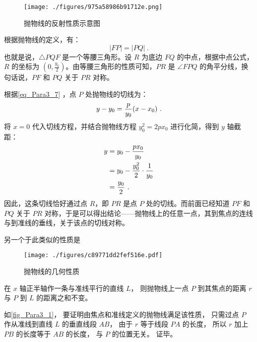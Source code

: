 \begin{figure}[ht]
\centering
\texttt{[image: ./figures/975a58986b91712e.png]}
\caption{抛物线的反射性质示意图} \label{fig_Para3_3}
\end{figure}

根据抛物线的定义，有：
\begin{equation}
|FP| = |PQ|~.
\end{equation}
也就是说，$\triangle PQF$ 是一个等腰三角形。设 $R$ 为底边 $FQ$ 的中点，根据中点公式，$R$ 的坐标为 $\displaystyle \left( 0, \frac{y_0}{2} \right)$。由等腰三角形的性质可知，$PR$ 是 $\angle FPQ$ 的角平分线，换句话说，$PF$ 和 $PQ$ 关于 $PR$ 对称。

根据\autoref{eq_Para3_7} ，点 $P$ 处抛物线的切线为：
\begin{equation}
y-y_0={p\over y_0}(x-x_0)~.
\end{equation}
将 $x = 0$ 代入切线方程，并结合抛物线方程 $y_0^2 = 2px_0$ 进行化简，得到 $y$ 轴截距：
\begin{equation}
\begin{split}
y&=y_0-{px_0\over y_0}\\
&=y_0-{y_0^2\over 2}\cdot{1\over y_0}\\
&={y_0\over 2}~.
\end{split}
\end{equation}
因此，这条切线恰好通过点 $R$，即 $PR$ 是点 $P$ 处的切线。而前面已经知道 $PF$ 和 $PQ$ 关于 $PR$ 对称，于是可以得出结论——抛物线上的任意一点，其到焦点的连线与到准线的垂线，关于该点的切线对称。

另一个于此类似的性质是
\begin{figure}[ht]
\centering
\texttt{[image: ./figures/c89771dd2fef516e.pdf]}
\caption{抛物线的几何性质} \label{fig_Para3_1}
\end{figure}

在 $x$ 轴正半轴作一条与准线平行的直线 $L$， 则抛物线上一点 $P$ 到其焦点的距离 $r$ 与 $P$ 到 $L$ 的距离之和不变。

如\autoref{fig_Para3_1}， 要证明由焦点和准线定义的抛物线满足该性质， 只需过点 $P$ 作从准线到直线 $L$ 的垂直线段 $AB$， 由于 $r$ 等于线段 $PA$ 的长度， 所以 $r$ 加上 $PB$ 的长度等于 $AB$ 的长度， 与 $P$ 的位置无关。 证毕。